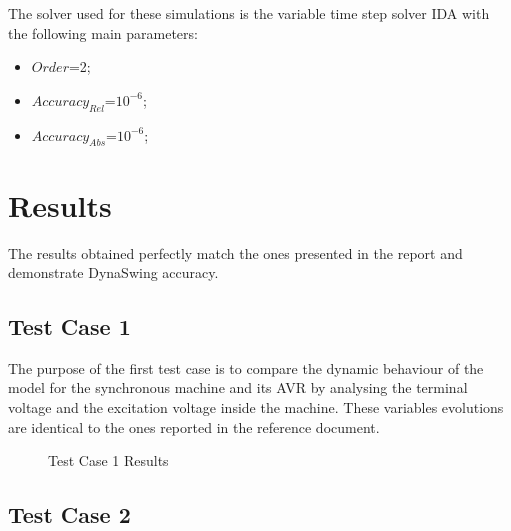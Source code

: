 \documentclass[a4paper, 12pt]{report}
\begin{document}
The solver used for these simulations is the variable time step solver IDA with the following main parameters:
\begin{itemize}
\item $Order$=2;
\item $Accuracy_{Rel}$=$10^{-6}$;
\item $Accuracy_{Abs}$=$10^{-6}$;
\end{itemize}

\section{Results}

The results obtained perfectly match the ones presented in the report and demonstrate DynaSwing accuracy.

\subsection{Test Case 1}

The purpose of the first test case is to compare the dynamic behaviour of the model for the synchronous machine and its AVR by analysing the terminal voltage and the excitation voltage inside the machine. These variables evolutions are identical to the ones reported in the reference document.

\begin{figure}[H]
\caption{Test Case 1 Results}
\end{figure}

\subsection{Test Case 2}
\end{document}
